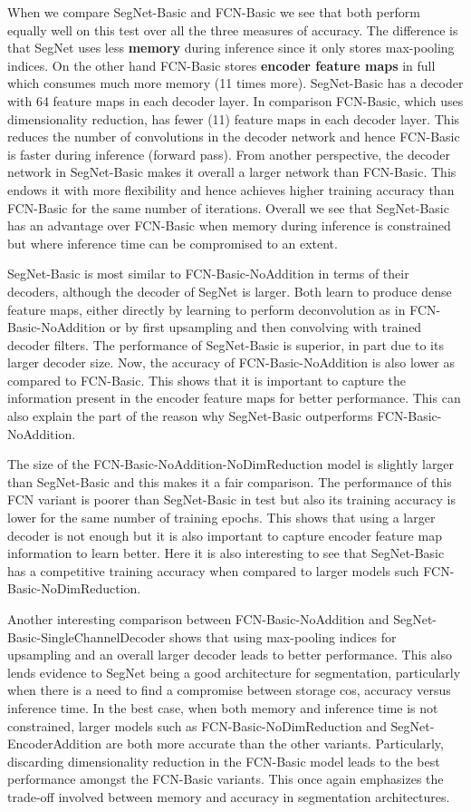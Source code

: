 When we compare SegNet-Basic and FCN-Basic we see that both perform equally well on this test over all the three measures of accuracy. The difference is that SegNet uses less \textbf{memory} during inference since it only stores max-pooling indices. On the other hand FCN-Basic stores \textbf{encoder feature maps} in full which consumes much more memory (11 times more). SegNet-Basic has a decoder with 64 feature maps in each decoder layer. In comparison FCN-Basic, which uses dimensionality reduction, has fewer (11) feature maps in each decoder layer. This reduces the number of convolutions in the decoder network and hence FCN-Basic is faster during inference (forward pass). From another perspective, the decoder network in SegNet-Basic makes it overall a larger network than FCN-Basic. This endows it with more flexibility and hence achieves higher training accuracy than FCN-Basic for the same number of iterations. Overall we see that SegNet-Basic has an advantage over FCN-Basic when memory during inference is constrained but where inference time can be compromised to an extent. 

SegNet-Basic is most similar to FCN-Basic-NoAddition in terms of their decoders, although the decoder of SegNet is larger. Both learn to produce dense feature maps, either directly by learning to perform deconvolution as in FCN-Basic-NoAddition or by first upsampling and then convolving with trained decoder filters. 
The performance of SegNet-Basic is superior, in part due to its larger decoder size. Now, the accuracy of FCN-Basic-NoAddition is also lower as compared to FCN-Basic. This shows that it is important to capture the information present in the encoder feature maps for better performance. This can also explain the part of the reason why SegNet-Basic outperforms FCN-Basic-NoAddition. 

The size of the FCN-Basic-NoAddition-NoDimReduction model is slightly larger than SegNet-Basic and this makes it a fair comparison. The performance of this FCN variant is poorer than SegNet-Basic in test but also its training accuracy is lower for the same number of training epochs. This shows that using a larger decoder is not enough but it is also important to capture encoder feature map information to learn better. Here it is also interesting to see that SegNet-Basic has a competitive training accuracy when compared to larger models such FCN-Basic-NoDimReduction. 

Another interesting comparison between FCN-Basic-NoAddition and SegNet-Basic-SingleChannelDecoder shows that using max-pooling indices for upsampling and an overall larger decoder leads to better performance. This also lends evidence to SegNet being a good architecture for segmentation, particularly when there is a need to find a compromise between storage cos, accuracy versus inference time. In the best case, when both memory and inference time is not constrained, larger models such as FCN-Basic-NoDimReduction and SegNet-EncoderAddition are both more accurate than the other variants. Particularly, discarding dimensionality reduction in the FCN-Basic model leads to the best performance amongst the FCN-Basic variants. This once again emphasizes the trade-off involved between memory and accuracy in segmentation architectures.

